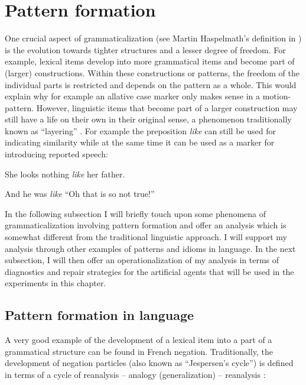 \section{Pattern formation}
\label{s:pattern-formation}

One crucial aspect of grammaticalization (see Martin Haspelmath's definition in ) is the evolution towards tighter structures and a lesser degree of freedom. For example, lexical items develop into more grammatical items and become part of (larger) constructions. Within these constructions or patterns, the freedom of the individual parts is restricted and depends on the pattern as a whole. This would explain why for example an allative case marker only makes sense in a motion-pattern. However, linguistic items that become part of a larger construction may still have a life on their own in their original sense, a phenomenon traditionally known as ``layering'' \citep[124--126]{hopper93grammaticalization}. For example the preposition {\em like} can still be used for indicating similarity while at the same time it can be used as a marker for introducing reported speech:

\ea
She looks nothing {\em like} her father.
\item And he was {\em like} ``Oh that is so not true!''
\z

In the following subsection I will briefly touch upon some phenomena of grammaticalization involving pattern formation and offer an analysis which is somewhat different from the traditional linguistic approach. I will support my analysis through other examples of patterns and idioms in language. In the next subsection, I will then offer an operationalization of my analysis in terms of diagnostics and repair strategies for the artificial agents that will be used in the experiments in this chapter.



\subsection{Pattern formation in language}

A very good example of the development of a lexical item into a part of a grammatical structure can be found in French negation. Traditionally, the development of negation particles (also known as ``Jespersen's cycle'') is defined in terms of a cycle of reanalysis -- analogy (generalization) -- reanalysis \cite[65--66]{hopper93grammaticalization}:

